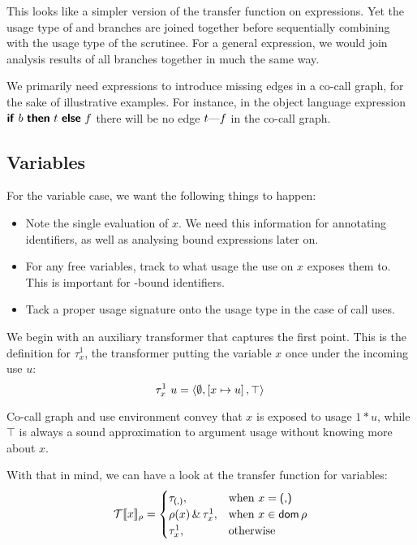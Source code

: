 This looks like a simpler version of the transfer function on  expressions.
Yet the usage type of  and  branches are joined together before sequentially combining with the usage type of the scrutinee.
For a general  expression, we would join analysis results of all branches together in much the same way.

We primarily need  expressions to introduce missing edges in a co-call graph, for the sake of illustrative examples. 
For instance, in the object language expression $\text{\textsf{\textbf{if}}}~b~\text{\textsf{\textbf{then}}}~{t}~\text{\textsf{\textbf{else}}}~{f}$ there will be no edge $t\text{---}f$ in the co-call graph.

\subsection{Variables}\label{sec:var}

For the variable case, we want the following things to happen:

\begin{itemize}
\item Note the single evaluation of $x$. We need this information for annotating identifiers, as well as analysing bound expressions later on.
\item For any free variables, track to what usage the use on $x$ exposes them to. This is important for -bound identifiers.
\item Tack a proper usage signature onto the usage type in the case of call uses.
\end{itemize}

We begin with an auxiliary transformer that captures the first point. 
This is the definition for $\tau^1_x$, the transformer putting the variable $x$ once under the incoming use $u$:
\[
\tau^1_x~u = \left\langle{}\emptyset,\left[x\mapsto u\right],\top\right\rangle{}
\]

Co-call graph and use environment convey that $x$ is exposed to usage $1*u$, while $\top$ is always a sound approximation to argument usage without knowing more about $x$.

With that in mind, we can have a look at the transfer function for variables:
\[
\mathcal{T}\llbracket x\rrbracket_{\rho} =
  \begin{cases}
    \tau_{\text{\textsf{(,)}}}, & \text{when } x = \text{\textsf{(,)}} \\
    \rho(x) \,\&\, \tau^1_x, & \text{when } x\in \mathsf{dom}\,\rho \\
    \tau^1_x, & \text{otherwise}
  \end{cases}
\]


